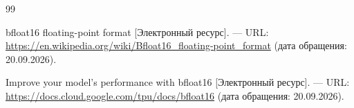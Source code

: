 
\begin{thebibliography}{99}

bfloat16 floating-point format [Электронный ресурс]. ---
URL: \url{https://en.wikipedia.org/wiki/Bfloat16_floating-point_format} (дата обращения: 20.09.2026).

Improve your model's performance with bfloat16 [Электронный ресурс]. ---
URL: \url{https://docs.cloud.google.com/tpu/docs/bfloat16} (дата обращения: 20.09.2026).


\end{thebibliography}